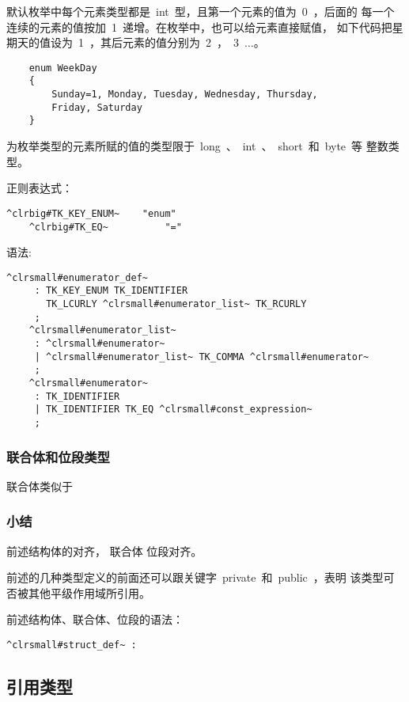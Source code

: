 默认枚举中每个元素类型都是~int~型，且第一个元素的值为~0~，后面的
每一个连续的元素的值按加~1~递增。在枚举中，也可以给元素直接赋值，
如下代码把星期天的值设为~1~，其后元素的值分别为~2~，~3~$\ldots$。

\ttfamily
\begin{lstlisting}
    enum WeekDay
    {
        Sunday=1, Monday, Tuesday, Wednesday, Thursday,
        Friday, Saturday
    }
\end{lstlisting}

为枚举类型的元素所赋的值的类型限于~long~、~int~、~short~和~byte~等
整数类型。

正则表达式：

\begin{Verbatim}[frame=single, commandchars=^\#\~]
    ^clrbig#TK_KEY_ENUM~    "enum"
    ^clrbig#TK_EQ~          "="
\end{Verbatim}

语法:

\begin{Verbatim}[frame=single, commandchars=^\#\~]
    ^clrsmall#enumerator_def~
     : TK_KEY_ENUM TK_IDENTIFIER
       TK_LCURLY ^clrsmall#enumerator_list~ TK_RCURLY
     ;
    ^clrsmall#enumerator_list~
     : ^clrsmall#enumerator~
     | ^clrsmall#enumerator_list~ TK_COMMA ^clrsmall#enumerator~
     ;
    ^clrsmall#enumerator~
     : TK_IDENTIFIER
     | TK_IDENTIFIER TK_EQ ^clrsmall#const_expression~
     ;
\end{Verbatim}

\subsubsection{联合体和位段类型}

联合体类似于

\subsubsection{小结}

前述结构体的对齐，
联合体
位段对齐。

前述的几种类型定义的前面还可以跟关键字~private~和~public~，表明
该类型可否被其他平级作用域所引用。

前述结构体、联合体、位段的语法：

\begin{Verbatim}[frame=single, commandchars=^\#\~]
    ^clrsmall#struct_def~ :
\end{Verbatim}

\subsection{引用类型}

